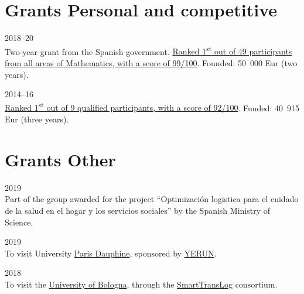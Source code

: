 \section*{Grants {\small Personal and competitive}}

\begin{paracol}{2}
  \textsc{2018--20}
\switchcolumn
  \\
  Two-year grant from the Spanish government.
  \href{https://santini.in/files/cv/jdc17.pdf}{Ranked 1\textsuperscript{st} out of 49 participants from all areas of Mathematics, with a score of 99/100}.
  Founded: 50~000 Eur (two years).
\end{paracol}

\begin{paracol}{2}
  \textsc{2014--16}
\switchcolumn
  \\
  \href{https://santini.in/files/cv/phd14.pdf}{Ranked 1\textsuperscript{st} out of 9 qualified participants, with a score of 92/100}.
  Funded: 40~915 Eur (three years).
\end{paracol}

\section*{Grants {\small Other}}

\begin{paracol}{2}
  \textsc{2019}
\switchcolumn
  \\
  Part of the group awarded for the project ``Optimización logistica para el cuidado de la salud en el hogar y los servicios sociales'' by the Spanish Ministry of Science.
\end{paracol}

\begin{paracol}{2}
  \textsc{2019}
\switchcolumn
  \\
  To visit University \href{https://www.dauphine.psl.eu/}{Paris Dauphine}, sponsored by \href{https://www.yerun.eu}{YERUN}.
\end{paracol}

\begin{paracol}{2}
  \textsc{2018}
\switchcolumn
  \\
  To visit the \href{https://www.unibo.it/}{University of Bologna}, through the \href{https://smarttranslog.wordpress.com/}{SmartTransLog} consortium.
\end{paracol}

